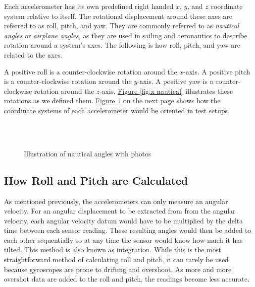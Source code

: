 Each accelerometer has its own predefined right handed $x$, $y$, and $z$ coordinate system relative to itself.
The rotational displacement around these axes are referred to as roll, pitch, and yaw.
They are commonly referred to as \textit{nautical angles} or \textit{airplane angles}, as they are used in sailing and aeronautics to describe rotation around a system’s axes.
The following is how roll, pitch, and yaw are related to the axes.\par

A positive roll is a counter-clockwise rotation around the $x$-axis.
A positive pitch is a counter-clockwise rotation around the $y$-axis.
A positive yaw is a counter-clockwise rotation around the $z$-axis.
\hyperref[{fig:x nautical}]{Figure \ref*{fig:x nautical}} illustrates these rotations as we defined them.
\hyperref[{fig:x nautical photos}]{Figure \ref*{fig:x nautical photos}} on the next page shows how the coordinate systems of each accelerometer would be oriented in test setups.\par

\begin{figure}
  \centering
   \\
     \\
  \caption[Nautical angle photos]{Illustration of nautical angles with photos}
  \label{fig:x nautical photos}
\end{figure}

\subsection{How Roll and Pitch are Calculated}
As mentioned previously, the accelerometers can only measure an angular velocity.
For an angular displacement to be extracted from from the angular velocity, each angular velocity datum would have to be multiplied by the delta time between each sensor reading.
These resulting angles would then be added to each other sequentially so at any time the sensor would know how much it has tilted.
This method is also known as integration.
While this is the most straightforward method of calculating roll and pitch, it can rarely be used because gyroscopes are prone to drifting and overshoot.
As more and more overshot data are added to the roll and pitch, the readings become less accurate.\par

